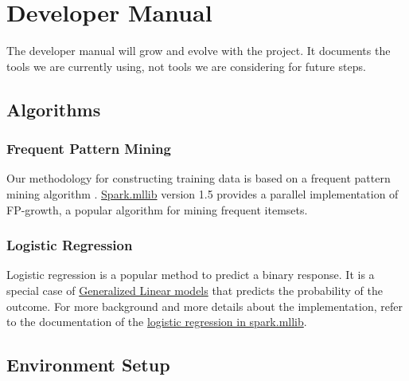 \chapter{Developer Manual}\label{ch:developerManual}

The developer manual will grow and evolve with the project. It documents the tools we are currently using, not tools we are considering for future steps.

\section{Algorithms}

\subsection{Frequent Pattern Mining}
Our methodology for constructing training data is based on a frequent pattern mining algorithm \cite{han2000mining}. \href{https://spark.apache.org/docs/1.5.0/mllib-frequent-pattern-mining.html}{Spark.mllib} version 1.5 provides a parallel implementation of FP-growth, a popular algorithm for mining frequent itemsets. 
\subsection{Logistic Regression}
Logistic regression is a popular method to predict a binary response. It is a special case of \href{https://en.wikipedia.org/wiki/Generalized_linear_model}{Generalized Linear models} that predicts the probability of the outcome. For more background and more details about the implementation, refer to the documentation of the \href{https://spark.apache.org/docs/1.5.0/mllib-linear-methods.html#logistic-regression}{logistic regression in spark.mllib}.

\section{Environment Setup}

